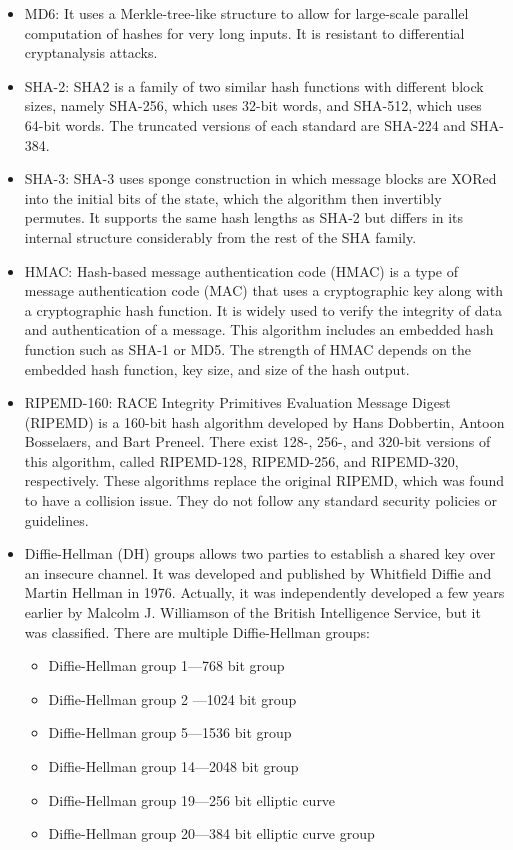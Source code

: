\begin{itemize}
    \item MD6: It uses a Merkle-tree-like structure to allow for large-scale parallel computation of hashes for very long inputs. It is resistant to differential cryptanalysis attacks.
    \item SHA-2: SHA2 is a family of two similar hash functions with different block sizes, namely SHA-256, which uses 32-bit words, and SHA-512, which uses 64-bit words. The truncated versions of each standard are SHA-224 and SHA-384.
    \item SHA-3: SHA-3 uses sponge construction in which message blocks are XORed into the initial bits of the state, which the algorithm then invertibly permutes. It supports the same hash lengths as SHA-2 but differs in its internal structure considerably from the rest of the SHA family.
    \item HMAC: Hash-based message authentication code (HMAC) is a type of message authentication code (MAC) that uses a cryptographic key along with a cryptographic hash function. It is widely used to verify the integrity of data and authentication of a message. This algorithm includes an embedded hash function such as SHA-1 or MD5. The strength of HMAC depends on the embedded hash function, key size, and size of the hash output.
    \item RIPEMD-160: RACE Integrity Primitives Evaluation Message Digest (RIPEMD) is a 160-bit hash algorithm developed by Hans Dobbertin, Antoon Bosselaers, and Bart Preneel. There exist 128-, 256-, and 320-bit versions of this algorithm, called RIPEMD-128, RIPEMD-256, and RIPEMD-320, respectively. These algorithms replace the original RIPEMD, which was found to have a collision issue. They do not follow any standard security policies or guidelines.
    \item Diffie-Hellman (DH) groups allows two parties to establish a shared key over an insecure channel. It was developed and published by Whitfield Diffie and Martin Hellman in 1976. Actually, it was independently developed a few years earlier by Malcolm J. Williamson of the British Intelligence Service, but it was classified. There are multiple Diffie-Hellman groups:
    \begin{itemize}
        \item Diffie-Hellman group 1—768 bit group
        \item Diffie-Hellman group 2 —1024 bit group
        \item Diffie-Hellman group 5—1536 bit group
        \item Diffie-Hellman group 14—2048 bit group
        \item Diffie-Hellman group 19—256 bit elliptic curve
        \item Diffie-Hellman group 20—384 bit elliptic curve group
    \end{itemize}
\end{itemize}
